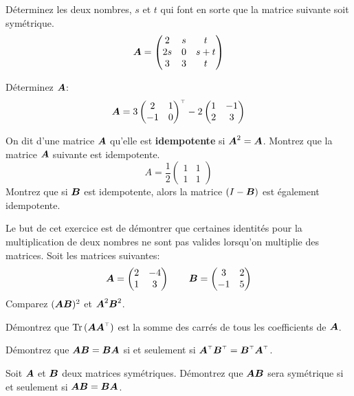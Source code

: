 \begin{TwoCol}
 \begin{exercice}
 Déterminez les deux nombres, $s$ et $t$ qui font en sorte que la matrice suivante soit symétrique.
 \[
 \boldsymbol{A} = \begin{pmatrix}
 2 & s & t \\
 2s & 0 & s+t \\
 3 & 3 & t
 \end{pmatrix}
 \]
 \end{exercice}
 
 \begin{exercice}
Déterminez $\boldsymbol{A}$:
\[
\matA = 3 \transp{\begin{pmatrix}
2 & 1\\
-1 & 0
\end{pmatrix}}
- 2 \begin{pmatrix}
1 & -1 \\
2 & 3
\end{pmatrix}
\] 
\end{exercice} 
 
 
 \begin{exercice}
 On dit d'une matrice $\boldsymbol{A}$ qu'elle est \textbf{idempotente} si  $\boldsymbol{A}^2 = \boldsymbol{A}$.
  Montrez que la matrice $\boldsymbol{A}$ suivante est idempotente.
 \[
 A = \frac{1}{2}\begin{pmatrix}
 1 & 1 \\
 1 & 1
 \end{pmatrix}
 \]
  Montrez que si $\boldsymbol{B}$ est idempotente, alors la matrice $(I-\boldsymbol{B})$ est également idempotente.
 \end{exercice}
 
 \begin{exercice}
 Le but de cet exercice est de démontrer que certaines identités pour la multiplication de deux nombres
 ne sont pas valides lorsqu'on multiplie des matrices.
 Soit les matrices suivantes:
 \[
 \boldsymbol{A} = \begin{pmatrix}
 2 & -4 \\
 1 & 3
 \end{pmatrix}
 \qquad
 \boldsymbol{B} = \begin{pmatrix}
 3 & 2 \\
 -1 & 5
 \end{pmatrix}
 \]
Comparez $(\boldsymbol{A}\boldsymbol{B})^2$ et $\boldsymbol{A}^2\boldsymbol{B}^2$.
 \end{exercice}
 
 \begin{exercice}
 Démontrez que $\tr{(\matA\transp{\matA})}$ est la somme des carrés de tous les coefficients de $\boldsymbol{A}$.
 \end{exercice}
 
  \begin{exercice}
 Démontrez que $\boldsymbol{A}\boldsymbol{B}=\boldsymbol{B}\boldsymbol{A}$ si et seulement si $\transp{\matA}\transp{\matB} = \transp{\matB}\transp{\matA}$.
 \end{exercice}
 
   \begin{exercice}
 Soit $\boldsymbol{A}$ et $\boldsymbol{B}$ deux matrices symétriques.  Démontrez que $\boldsymbol{A}\boldsymbol{B}$ sera symétrique si et seulement si
 $\boldsymbol{A}\boldsymbol{B} = \boldsymbol{B}\boldsymbol{A}$. 
 \end{exercice}
 
 \end{TwoCol}